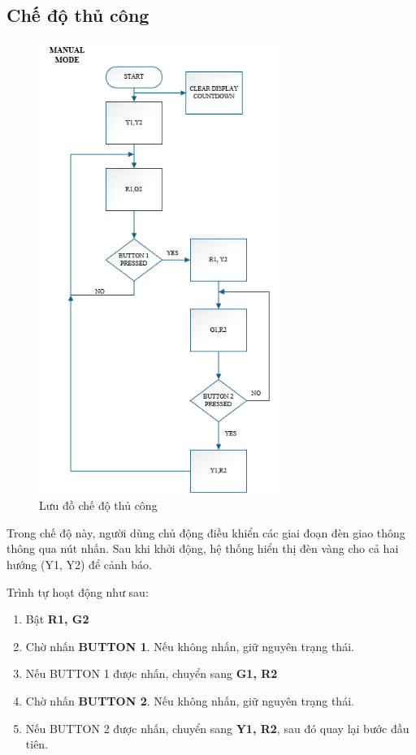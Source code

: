 \subsection{Chế độ thủ công}
\begin{figure}[H]
    \centering
    \includegraphics[width=0.7\textwidth]{pictures/manual.png}
    \caption{Lưu đồ chế độ thủ công}
\end{figure}
\cleardoublepage
Trong chế độ này, người dùng chủ động điều khiển các giai đoạn đèn giao thông thông qua nút nhấn. Sau khi khởi động, hệ thống hiển thị đèn vàng cho cả hai hướng (Y1, Y2) để cảnh báo.

Trình tự hoạt động như sau:

\begin{enumerate}
  \item Bật \textbf{R1, G2}
  \item Chờ nhấn \textbf{BUTTON 1}. Nếu không nhấn, giữ nguyên trạng thái.
  \item Nếu BUTTON 1 được nhấn, chuyển sang \textbf{G1, R2}
  \item Chờ nhấn \textbf{BUTTON 2}. Nếu không nhấn, giữ nguyên trạng thái.
  \item Nếu BUTTON 2 được nhấn, chuyển sang \textbf{Y1, R2}, sau đó quay lại bước đầu tiên.
\end{enumerate}

